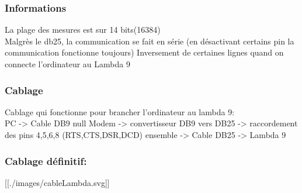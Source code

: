 \hypertarget{informations}{%
\subsubsection{Informations}\label{informations}}

La plage des mesures est sur 14 bits(16384)\\
Malgrès le db25, la communication se fait en série (en désactivant
certains pin la communication fonctionne toujours) Inversement de
certaines lignes quand on connecte l'ordinateur au Lambda 9

\hypertarget{cablage}{%
\subsubsection{Cablage}\label{cablage}}

Cablage qui fonctionne pour brancher l'ordinateur au lambda 9:\\
PC -\textgreater{} Cable DB9 null Modem -\textgreater{} convertisseur
DB9 vers DB25 -\textgreater{} raccordement des pins 4,5,6,8
(RTS,CTS,DSR,DCD) ensemble -\textgreater{} Cable DB25 -\textgreater{}
Lambda 9

\hypertarget{cablage-duxe9finitif}{%
\subsubsection{Cablage définitif:}\label{cablage-duxe9finitif}}

{[}{[}./images/cableLambda.svg{]}{]}

